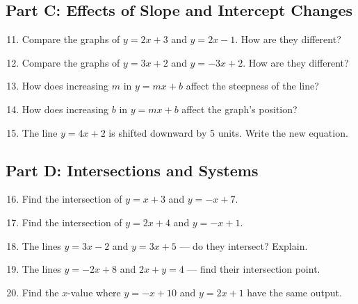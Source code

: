 \documentclass[14pt]{extarticle}
\begin{document}
\subsection*{Part C: Effects of Slope and Intercept Changes}
\begin{enumerate}
    \setcounter{enumi}{10}
    \item Compare the graphs of \(y = 2x + 3\) and \(y = 2x - 1\).  
          How are they different?
    \item Compare the graphs of \(y = 3x + 2\) and \(y = -3x + 2\).  
          How are they different?
    \item How does increasing \(m\) in \(y = mx + b\) affect the steepness of the line?
    \item How does increasing \(b\) in \(y = mx + b\) affect the graph’s position?
    \item The line \(y = 4x + 2\) is shifted downward by 5 units.  
          Write the new equation.
\end{enumerate}

\subsection*{Part D: Intersections and Systems}
\begin{enumerate}
    \setcounter{enumi}{15}
    \item Find the intersection of \(y = x + 3\) and \(y = -x + 7\).
    \item Find the intersection of \(y = 2x + 4\) and \(y = -x + 1\).
    \item The lines \(y = 3x - 2\) and \(y = 3x + 5\) — do they intersect? Explain.
    \item The lines \(y = -2x + 8\) and \(2x + y = 4\) — find their intersection point.
    \item Find the \(x\)-value where \(y = -x + 10\) and \(y = 2x + 1\) have the same output.
\end{enumerate}
\end{document}
